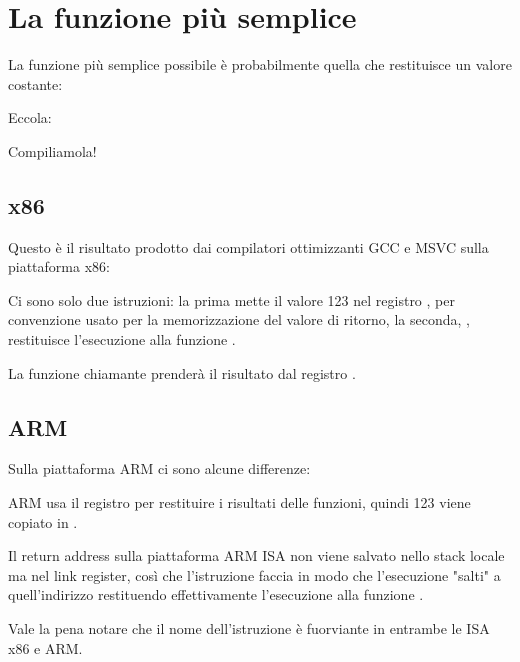 \chapter{La funzione più semplice}

La funzione più semplice possibile è probabilmente quella che restituisce un valore costante:

Eccola:



Compiliamola!

\section{x86}

Questo è il risultato prodotto dai compilatori ottimizzanti GCC e MSVC sulla piattaforma x86:



Ci sono solo due istruzioni: la prima mette il valore 123 nel registro \EAX, per convenzione usato per la memorizzazione del valore di ritorno, la seconda, \RET, restituisce l'esecuzione alla funzione .

La funzione chiamante prenderà il risultato dal registro \EAX.

\ifdefined\IncludeARM
\section{ARM}

Sulla piattaforma ARM ci sono alcune differenze:



ARM usa il registro  per restituire i risultati delle funzioni, quindi 123 viene copiato in .

Il return address sulla piattaforma ARM \ac{ISA} non viene salvato nello stack locale ma nel link register, 
così che l'istruzione  faccia in modo che l'esecuzione "salti" a quell'indirizzo \EMDASH{} restituendo effettivamente l'esecuzione alla funzione .
\fi %

Vale la pena notare che il nome dell'istruzione \MOV è fuorviante in entrambe le \ac{ISA} x86 e ARM. 

